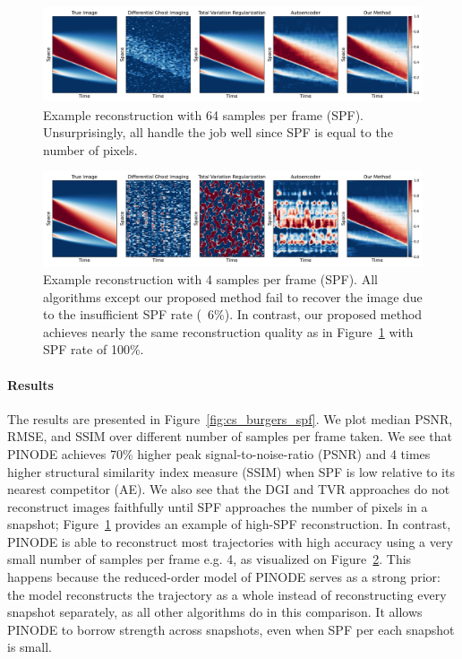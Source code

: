 \begin{figure}
    \centering
    	\includegraphics[width=\textwidth]{figures/cs_burgers_comparison_64.pdf}
    \caption{\label{fig:cs_burgers_example_large_spf} Example reconstruction with 64 samples per frame (SPF). Unsurprisingly, all handle the job well since SPF is equal to the number of pixels.}
\end{figure}

\begin{figure}
    \centering
    	\includegraphics[width=\textwidth]{figures/cs_burgers_comparison_4.pdf}
    \caption{\label{fig:cs_burgers_example_small_spf}Example reconstruction with 4 samples per frame (SPF). All algorithms except our proposed method fail to recover the image due to the insufficient SPF rate (~6\%). In contrast, our proposed method achieves nearly the same reconstruction quality as in Figure~\ref{fig:cs_burgers_example_large_spf} with SPF rate of 100\%.}
\end{figure}

\paragraph{Results} The results are presented in Figure~\ref{fig:cs_burgers_spf}. We plot median PSNR, RMSE, and SSIM over different number of samples per frame taken. We see that PINODE achieves 70\% higher peak signal-to-noise-ratio (PSNR) and 4 times higher structural similarity index measure (SSIM) when SPF is low relative to its nearest competitor (AE). We also see that the DGI and TVR approaches do not reconstruct images faithfully until SPF approaches the number of pixels in a snapshot; Figure~\ref{fig:cs_burgers_example_large_spf} provides an example of high-SPF reconstruction. In contrast, PINODE is able to reconstruct most trajectories with high accuracy using a very small number of samples per frame e.g. 4, as visualized on Figure~\ref{fig:cs_burgers_example_small_spf}. This happens because the reduced-order model of PINODE serves as a strong prior: the model reconstructs the trajectory as a whole instead of reconstructing every snapshot separately, as all other algorithms do in this comparison. It allows PINODE to borrow strength across snapshots, even when SPF per each snapshot is small.

